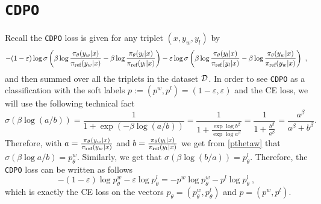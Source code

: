 \section{\texttt{CDPO}} \label{Appendix:CDPO}
    Recall the \texttt{CDPO} \cite{CDPO} loss is given for any triplet $(x , y_{w} , y_{l})$ by
    \begin{equation*}
        -(1 - \varepsilon)\log \sigma\left(\beta\log \frac{\pi_{\theta}(y_w | x)}{\pi_{\textrm{ref}}(y_w | x)} - \beta\log \frac{\pi_{\theta}(y_l | x)}{\pi_{\textrm{ref}}(y_l | x)}\right) - \varepsilon\log \sigma\left(\beta\log \frac{\pi_{\theta}(y_l | x)}{\pi_{\textrm{ref}}(y_l | x)} - \beta\log \frac{\pi_{\theta}(y_w | x)}{\pi_{\textrm{ref}}(y_w | x)}\right)\ ,
    \end{equation*}
    and then summed over all the triplets in the dataset ${\cal D}$. In order to see \texttt{CDPO} as a classification with the soft labels $p := (p^w,p^l) = (1-\varepsilon,\varepsilon)$ and the CE loss, we will use the following technical fact
    \begin{equation*}
        \sigma(\beta\log(a/b)) = \frac{1}{1 + \exp(-\beta\log(a/b))} = \frac{1}{1 + \frac{\exp{\log b^{\beta}}}{\exp{\log a^{\beta}}}} = \frac{1}{1 + \frac{b^{\beta}}{a^{\beta}}} = \frac{a^{\beta}}{a^{\beta} + b^{\beta}}.
    \end{equation*}
    Therefore, with $a = \frac{\pi_{\theta}(y_w|x)}{\pi_{\textrm{ref}}(y_w|x)}$ and $b = \frac{\pi_{\theta}(y_l|x)}{\pi_{\textrm{ref}}(y_l|x)}$ we get from \eqref{pthetaw} that $\sigma(\beta\log a/b) = p^{w}_{\theta}$. Similarly, we get that $\sigma(\beta\log(b/a)) = p^{l}_{\theta}$. Therefore, the \texttt{CDPO} loss can be written as follows
    \begin{equation*}
         -(1 - \varepsilon)\log p^{w}_{\theta} - \varepsilon \log p^{l}_{\theta} = -p^{w}\log p^{w}_{\theta} - p^{l}\log p^{l}_{\theta}\ ,
    \end{equation*}
    which is exactly the CE loss on the vectors $p_{\theta} = (p^{w}_{\theta} , p^{l}_{\theta})$ and $p = (p^w,p^l)$.

